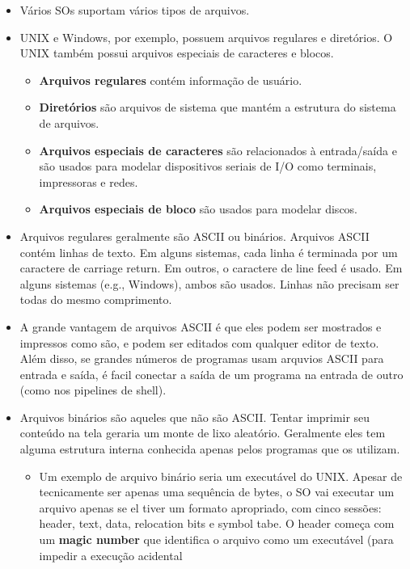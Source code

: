 \documentclass[10pt]{article}
\begin{document}
\begin{itemize}
    \item Vários SOs suportam vários tipos de arquivos.
    \item UNIX e Windows, por exemplo, possuem arquivos regulares e diretórios. O UNIX também possui 
    arquivos especiais de caracteres e blocos. 
    \begin{itemize}
        \item \textbf{Arquivos regulares} contém informação de usuário. 
        \item \textbf{Diretórios} são arquivos de sistema que mantém a estrutura do sistema de arquivos.
        \item \textbf{Arquivos especiais de caracteres} são relacionados à entrada/saída e são usados
        para modelar dispositivos seriais de I/O como terminais, impressoras e redes.
        \item \textbf{Arquivos especiais de bloco} são usados para modelar discos.
    \end{itemize}
    \item Arquivos regulares geralmente são ASCII ou binários. Arquivos ASCII contém linhas de texto.
    Em alguns sistemas, cada linha é terminada por um caractere de carriage return. Em outros, o caractere
    de line feed é usado. Em alguns sistemas (e.g., Windows), ambos são usados. Linhas não precisam ser todas
    do mesmo comprimento.
    \item A grande vantagem de arquivos ASCII é que eles podem ser mostrados e impressos como são, e podem ser
    editados com qualquer editor de texto. Além disso, se grandes números de programas usam arquvios ASCII 
    para entrada e saída, é facil conectar a saída de um programa na entrada de outro (como nos pipelines
    de shell).
    \item Arquivos binários são aqueles que não são ASCII. Tentar imprimir seu conteúdo na tela geraria
    um monte de lixo aleatório. Geralmente eles tem alguma estrutura interna conhecida apenas pelos programas
    que os utilizam. 
    \begin{itemize}
        \item Um exemplo de arquivo binário seria um executável do UNIX. Apesar de tecnicamente ser apenas
        uma sequência de bytes, o SO vai executar um arquivo apenas se el tiver um formato apropriado, com
        cinco sessões: header, text, data, relocation bits e symbol tabe. O header começa com um 
        \textbf{magic number} que identifica o arquivo como um executável (para impedir a execução acidental

\end{itemize}
\end{itemize}
\end{document}
